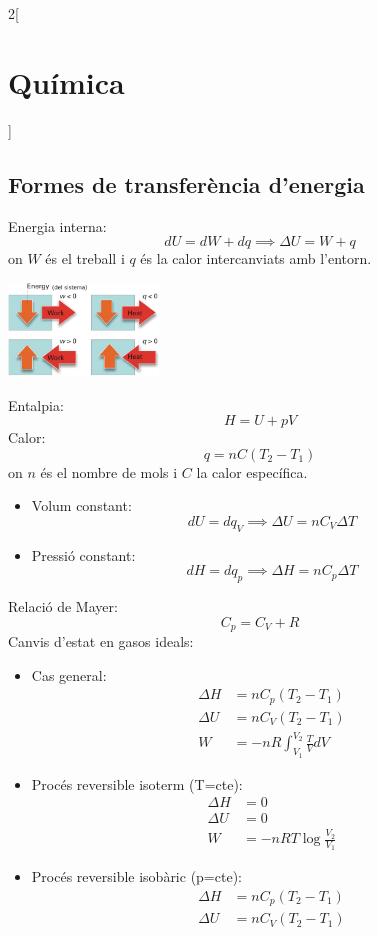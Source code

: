 \documentclass[class=article,10pt,crop=false]{standalone}
\begin{document}
\begin{multicols}{2}[\section{Química}]
\subsection{Formes de transferència d'energia}
Energia interna: 
$$dU=dW+dq\implies\Delta U=W+q$$ {\footnotesize on $W$ és el treball i $q$ és la calor intercanviats amb l'entorn.}\newline
\begin{minipage}{\linewidth} 
    \centering
    \includegraphics[width=4cm]{Physics/1st/Chemistry/Images/workheat.jpg} 
    \label{fig:my_label}
\end{minipage}
Entalpia: $$H=U+pV$$
Calor: $$q=nC(T_2-T_1)$$ {\footnotesize on $n$ és el nombre de mols i $C$ la calor específica.}
\begin{itemize}
    \item Volum constant: $$dU=dq_V\implies\Delta U=nC_V\Delta T$$
    \item Pressió constant: $$dH=dq_p\implies\Delta H=nC_p\Delta T$$
\end{itemize}
Relació de Mayer: $$C_p=C_V+R$$
Canvis d'estat en gasos ideals:
\begin{itemize}
    \item Cas general:
    \begin{align*}
        \Delta H&=nC_p(T_2-T_1)\\
        \Delta U&=nC_V(T_2-T_1)\\
        W&=-nR\int_{V_1}^{V_2}\frac{T}{V}dV
    \end{align*}
    \item Procés reversible isoterm (T=cte):
    \begin{align*}
        \Delta H&=0\\
        \Delta U&=0\\
        W&=-nRT\log\frac{V_2}{V_1}
    \end{align*}
    \item Procés reversible isobàric (p=cte):
    \begin{align*}
        \Delta H&=nC_p(T_2-T_1)\\
        \Delta U&=nC_V(T_2-T_1)\\

\end{align*}
\end{itemize}
\end{multicols}
\end{document}
